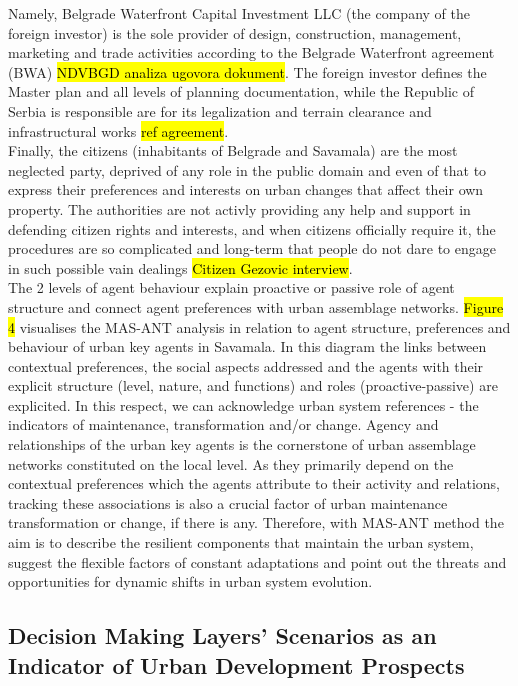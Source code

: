 \documentclass[11pt]{report}
\begin{document}
Namely, Belgrade Waterfront Capital Investment LLC (the company of the foreign investor) is the sole provider of design, construction, management, marketing and trade activities according to the Belgrade Waterfront agreement (BWA) \hl{NDVBGD analiza ugovora dokument}.
The foreign investor defines the Master plan and all levels of planning documentation, while the Republic of Serbia is responsible are for its legalization and terrain clearance and infrastructural works \hl{ref agreement}.
\\
Finally, the citizens (inhabitants of Belgrade and Savamala) are the most neglected party, deprived of any role in the public domain and even of that to express their preferences and interests on urban changes that affect their own property. 
The authorities are not activly providing any help and support in defending citizen rights and interests, and when citizens officially require it, the procedures are so complicated and long-term that people do not dare to engage in such possible vain dealings \hl{Citizen Gezovic interview}. 
\\
The 2 levels of agent behaviour explain proactive or passive role of agent structure and connect agent preferences with urban assemblage networks.
\hl{Figure 4} visualises the MAS-ANT analysis in relation to agent structure, preferences and behaviour of urban key agents in Savamala. In this diagram the links between contextual preferences, the social aspects addressed and the agents with their explicit structure (level, nature, and functions) and roles (proactive-passive) are explicited.
In this respect, we can acknowledge urban system references - the indicators of maintenance, transformation and/or change.
Agency and relationships of the urban key agents is the cornerstone of urban assemblage networks constituted on the local level. As they primarily depend on the contextual preferences which the agents attribute to their activity and relations, tracking these associations is also a crucial factor of urban maintenance transformation or change, if there is any.
Therefore, with MAS-ANT method the aim is to describe the resilient components that maintain the urban system, suggest the flexible factors of constant adaptations and point out the threats and opportunities for dynamic shifts in urban system evolution.



\subsection{Decision Making Layers' Scenarios as an Indicator of Urban Development Prospects}
\end{document}
